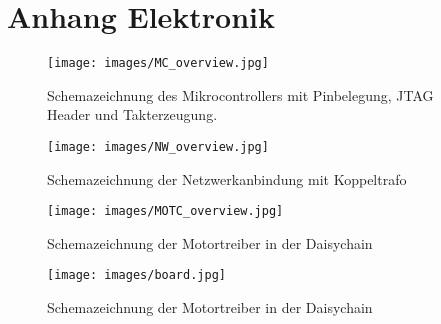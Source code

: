 \section{Anhang Elektronik}

\begin{figure}[h]
\texttt{[image: images/MC\_overview.jpg]}
\hspace{-54pt}
\caption{Schemazeichnung des Mikrocontrollers mit Pinbelegung, JTAG Header und Takterzeugung. }
\label{SchemMic}
\end{figure}

\begin{figure}[h]
\texttt{[image: images/NW\_overview.jpg]}
\hspace{-54pt}
\caption{Schemazeichnung der Netzwerkanbindung mit Koppeltrafo}
\label{SchemNetwork}
\end{figure}


\begin{figure}[h]
\texttt{[image: images/MOTC\_overview.jpg]}
\hspace{-54pt}
\caption{Schemazeichnung der Motortreiber in der Daisychain}
\label{SchemMotor}
\end{figure}

\begin{figure}[h]
\texttt{[image: images/board.jpg]}
\hspace{-54pt}
\caption{Schemazeichnung der Motortreiber in der Daisychain}
\label{Board}
\end{figure}
